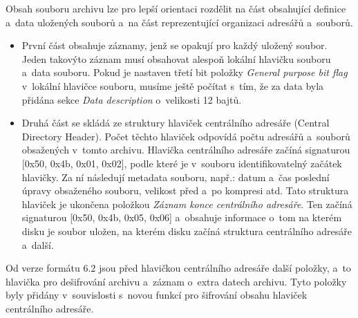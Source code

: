  Obsah souboru archivu lze pro lepší orientaci rozdělit na část obsahující definice a~data
uložených souborů a~na část reprezentující organizaci adresářů a~souborů.
\begin{itemize}
    \item První část obsahuje záznamy, jenž se opakují pro každý uložený soubor. Jeden takovýto
záznam musí obsahovat alespoň lokální hlavičku souboru a~data souboru. Pokud je nastaven
třetí bit položky {\it General purpose bit flag} v~lokální hlavičce souboru, musíme ještě počítat
s~tím, že za data byla přidána sekce {\it Data description} o~velikosti 12 bajtů.
    \item Druhá část se skládá ze struktury hlaviček centrálního adresáře (Central Directory
	Header). Počet těchto hlaviček odpovídá počtu adresářů a~souborů obsažených v~tomto
	archivu. Hlavička centrálního adresáře začíná signaturou [0x50, 0x4b, 0x01, 0x02], podle
	které je v~souboru identifikovatelný začátek hlavičky. Za ní následují metadata souboru,
	např.: datum a~čas poslední úpravy obsaženého souboru, velikost před a~po kompresi atd.
	Tato struktura hlaviček je ukončena položkou {\it Záznam konce centrálního adresáře}. Ten
	začíná signaturou [0x50, 0x4b, 0x05, 0x06] a~obsahuje informace o~tom na kterém disku je
	soubor uložen, na kterém disku začíná struktura centrálního adresáře a~další.
\end{itemize}
Od verze formátu 6.2 jsou před hlavičkou centrálního adresáře další položky, a~to hlavička
pro dešifrování archivu a~záznam o~extra datech archivu. Tyto položky byly přidány
v~souvislosti s~novou funkcí pro šifrování obsahu hlaviček centrálního adresáře.

